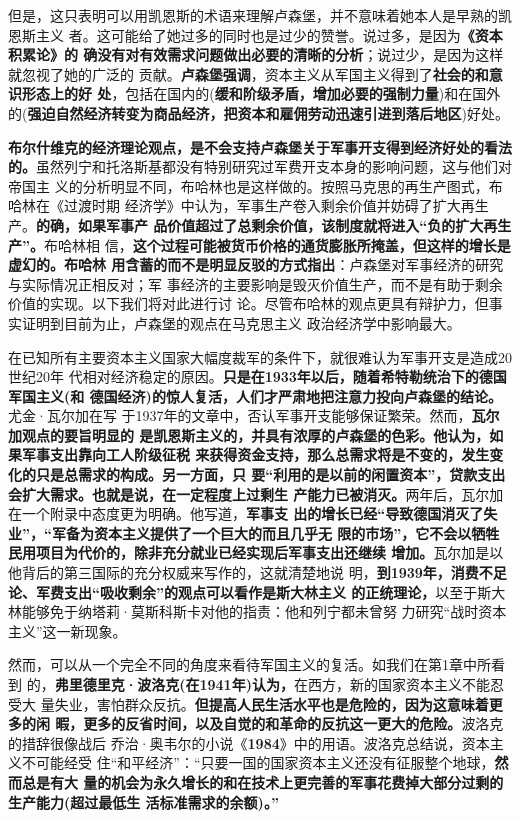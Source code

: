 但是，这只表明可以用凯恩斯的术语来理解卢森堡，并不意味着她本人是早熟的凯恩斯主义
者。这可能给了她过多的同时也是过少的赞誉。说过多，是因为\textbf{《资本积累论》的
  确没有对有效需求问题做出必要的清晰的分析}；说过少，是因为这样就忽视了她的广泛的
贡献。\textbf{卢森堡强调}，资本主义从军国主义得到了\textbf{社会的和意识形态上的好
  处}，包括在国内的(\textbf{缓和阶级矛盾，增加必要的强制力量})和在国外
的(\textbf{强迫自然经济转变为商品经济，把资本和雇佣劳动迅速引进到落后地区})好处。

\textbf{布尔什维克的经济理论观点，是不会支持卢森堡关于军事开支得到经济好处的看法
  的。}虽然列宁和托洛斯基都没有特别研究过军费开支本身的影响问题，这与他们对帝国主
义的分析明显不同，布哈林也是这样做的。按照马克思的再生产图式，布哈林在《过渡时期
经济学》中认为，军事生产卷入剩余价值并妨碍了扩大再生产。\textbf{的确，如果军事产
  品价值超过了总剩余价值，该制度就将进入“负的扩大再生产”。}布哈林相
信，\textbf{这个过程可能被货币价格的通货膨胀所掩盖，但这样的增长是虚幻的。布哈林
  用含蓄的而不是明显反驳的方式指出}：卢森堡对军事经济的研究与实际情况正相反对；军
事经济的主要影响是毁灭价值生产，而不是有助于剩余价值的实现。以下我们将对此进行讨
论。尽管布哈林的观点更具有辩护力，但事实证明到目前为止，卢森堡的观点在马克思主义
政治经济学中影响最大。

在已知所有主要资本主义国家大幅度裁军的条件下，就很难认为军事开支是造成20世纪20年
代相对经济稳定的原因。\textbf{只是在1933年以后，随着希特勒统治下的德国军国主义(和
  德国经济)的惊人复活，人们才严肃地把注意力投向卢森堡的结论。}尤金·瓦尔加在写
于1937年的文章中，否认军事开支能够保证繁荣。然而，\textbf{瓦尔加观点的要旨明显的
  是凯恩斯主义的，并具有浓厚的卢森堡的色彩。他认为，如果军事支出靠向工人阶级征税
  来获得资金支持，那么总需求将是不变的，发生变化的只是总需求的构成。另一方面，只
  要“利用的是以前的闲置资本”，贷款支出会扩大需求。也就是说，在一定程度上过剩生
  产能力已被消灭。}两年后，瓦尔加在一个附录中态度更为明确。他写道，\textbf{军事支
  出的增长已经“导致德国消灭了失业”，“军备为资本主义提供了一个巨大的而且几乎无
  限的市场”，它不会以牺牲民用项目为代价的，除非充分就业已经实现后军事支出还继续
  增加。}瓦尔加是以他背后的第三国际的充分权威来写作的，这就清楚地说
明，\textbf{到1939年，消费不足论、军费支出“吸收剩余”的观点可以看作是斯大林主义
  的正统理论，}以至于斯大林能够免于纳塔莉·莫斯科斯卡对他的指责：他和列宁都未曾努
力研究“战时资本主义”这一新现象。

然而，可以从一个完全不同的角度来看待军国主义的复活。如我们在第1章中所看到
的，\textbf{弗里德里克·波洛克(在1941年)认为，}在西方，新的国家资本主义不能忍受大
量失业，害怕群众反抗。\textbf{但提高人民生活水平也是危险的，因为这意味着更多的闲
  暇，更多的反省时间，以及自觉的和革命的反抗这一更大的危险。}波洛克的措辞很像战后
乔治·奥韦尔的小说《\textbf{1984}》中的用语。波洛克总结说，资本主义不可能经受
住“和平经济”：“只要一国的国家资本主义还没有征服整个地球，\textbf{然而总是有大
  量的机会为永久增长的和在技术上更完善的军事花费掉大部分过剩的生产能力(超过最低生
  活标准需求的余额)。”}

